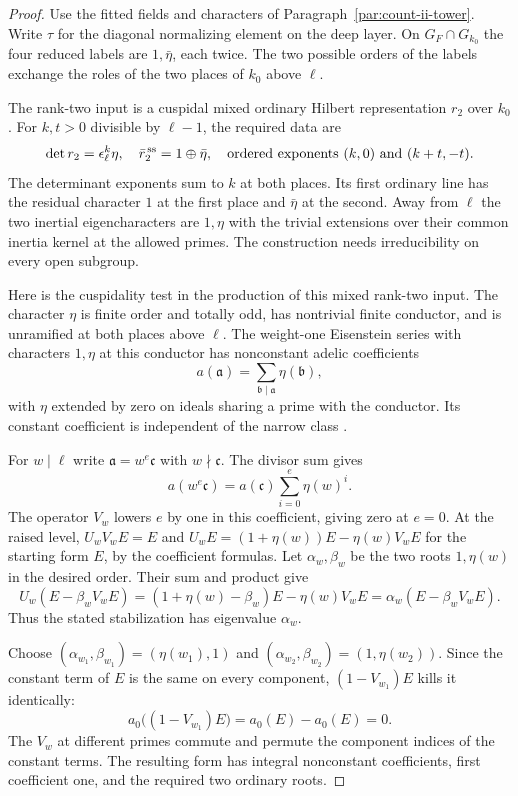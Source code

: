 \begin{proof}

Use the fitted fields and characters of
Paragraph~\ref{par:count-ii-tower}. Write \(\tau\) for the
diagonal normalizing element on the deep layer. On
\(G_F\cap G_{k_0}\) the four reduced labels are
\(1,\bar\eta\), each twice. The two
possible orders of the labels exchange the roles of the
two places of \(k_0\) above \(\ell\).

The rank-two input is a cuspidal mixed ordinary Hilbert
representation \(r_2\) over \(k_0\). For \(k,t>0\) divisible by \(\ell-1\), the required data are
\[
   \det r_2=\epsilon_\ell^k\eta,\quad
   \bar r_2^{\,\rm ss}=1\oplus\bar\eta,\quad
   \text{ordered exponents }(k,0)\text{ and }(k+t,-t).
\]
The determinant exponents sum to \(k\) at both places.
Its first ordinary line has the residual character \(1\)
at the first place and \(\bar\eta\) at the second. Away
from \(\ell\) the two inertial eigencharacters are \(1,\eta\)
with the trivial extensions over their common inertia kernel
at the allowed primes. The construction needs irreducibility
on every open subgroup.

Here is the cuspidality test in the production of this
mixed rank-two input. The character \(\eta\) is finite order
and totally odd, has nontrivial finite conductor, and is
unramified at both places above \(\ell\). The weight-one
Eisenstein series with characters \(1,\eta\) at this
conductor has nonconstant adelic coefficients
\[
 a(\mathfrak a)=\sum_{\mathfrak b\mid\mathfrak a} \eta(\mathfrak b),
\]
with \(\eta\) extended by zero on
ideals sharing a prime with the conductor. Its constant
coefficient is independent of the narrow class
\cite[Section 2.2, Proposition 2.1]{dasgupta-darmon-pollack}.

For \(w\mid\ell\) write \(\mathfrak a=w^e\mathfrak c\) with \(w\nmid\mathfrak c\). The divisor sum gives
\[
 a(w^e\mathfrak c)=a(\mathfrak c)\sum_{i=0}^e\eta(w)^i .
\]
The operator \(V_w\) lowers \(e\) by one in this coefficient, giving zero at \(e=0\). At the raised level,
\(U_w V_w E=E\) and
\(U_w E=(1+\eta(w))E-\eta(w)V_w E\) for the starting
form \(E\), by the coefficient formulas. Let \(\alpha_w,\beta_w\) be the two roots \(1,\eta(w)\)
in the desired order. Their sum and product give
\[
 U_w(E-\beta_w V_wE)
   =(1+\eta(w)-\beta_w)E-\eta(w)V_wE
   =\alpha_w(E-\beta_w V_wE).
\]
Thus the stated stabilization has eigenvalue \(\alpha_w\).

Choose \((\alpha_{w_1},\beta_{w_1})=(\eta(w_1),1)\) and
\((\alpha_{w_2},\beta_{w_2})=(1,\eta(w_2))\).
Since the constant term of \(E\) is the same on every
component, \((1-V_{w_1})E\) kills it identically:
\[
     a_0\bigl((1-V_{w_1})E\bigr)=a_0(E)-a_0(E)=0.
\]
The \(V_w\) at different primes commute and permute the
component indices of the constant terms. The resulting
form has integral nonconstant coefficients, first
coefficient one, and the required two ordinary roots.


\end{proof}
